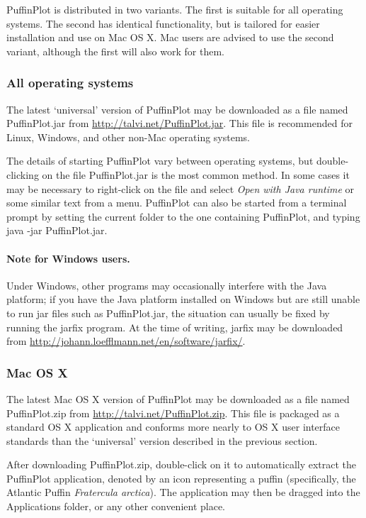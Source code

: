 \documentclass[a4paper,british]{article}
\newcommand{\ppcmd}[1]{\textsf{#1}} %
\begin{document}
PuffinPlot is distributed in two variants. The first is suitable for all
operating systems. The second has identical functionality, but is
tailored for easier installation and use on Mac OS X. Mac users are
advised to use the second variant, although the first will also work for
them.

\subsubsection{All operating systems}

The latest `universal' version of PuffinPlot may be downloaded as a file
named \textsf{PuffinPlot.jar} from
\url{http://talvi.net/PuffinPlot.jar}. This file is recommended for
Linux, Windows, and other non-Mac operating systems.

The details of starting PuffinPlot vary between operating systems, but
double-clicking on the file \textsf{PuffinPlot.jar} is the most common
method. In some cases it may be necessary to right-click on the file and
select \emph{Open with Java runtime} or some similar text from a menu.
PuffinPlot can also be started from a terminal prompt by setting the
current folder to the one containing PuffinPlot, and typing
\textsf{java -jar PuffinPlot.jar}.

\paragraph{Note for Windows users.} Under Windows, other programs may
occasionally interfere with the Java platform; if you have the Java platform
installed on Windows but are still unable to run \ppcmd{jar} files such as
\ppcmd{PuffinPlot.jar}, the situation can usually be fixed by running the
\ppcmd{jarfix} program. At the time of writing, \ppcmd{jarfix} may be
downloaded from \url{http://johann.loefflmann.net/en/software/jarfix/}.

\subsubsection{Mac OS X}

The latest Mac OS X version of PuffinPlot may be downloaded as a file
named \textsf{PuffinPlot.zip} from
\url{http://talvi.net/PuffinPlot.zip}. This file is packaged as a
standard OS X application and conforms more nearly to OS X user
interface standards than the `universal' version described in the
previous section.

After downloading \textsf{PuffinPlot.zip}, double-click on it to
automatically extract the PuffinPlot application, denoted by an icon
representing a puffin (specifically, the Atlantic Puffin
\emph{Fratercula arctica}). The application may then be dragged into the
Applications folder, or any other convenient place.
\end{document}
